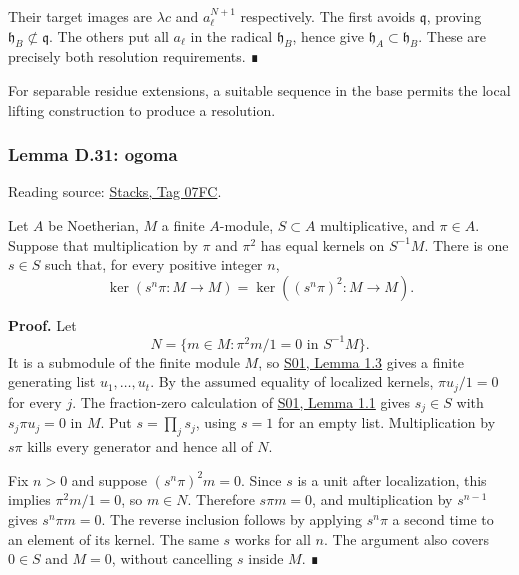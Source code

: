 \documentclass[11pt,a4paper,openany]{report}
\begin{document}
Their target images are \(\lambda c\) and \(a_\ell^{N+1}\) respectively. The first avoids \(\mathfrak q\), proving \(\mathfrak h_B\not\subset\mathfrak q\). The others put all \(a_\ell\) in the radical \(\mathfrak h_B\), hence give \(\mathfrak h_A\subset\mathfrak h_B\). These are precisely both resolution requirements. ∎

\label{AG-RG-S05-smoothing-section-separable}

For separable residue extensions, a suitable sequence in the base permits the local lifting construction to produce a resolution.

\label{AG-RG-S05-smoothing-lemma-ogoma}

\subsubsection{Lemma D.31: ogoma}\label{AG-RG-S05-lemma-d.31-ogoma}

Reading source: \href{https://stacks.math.columbia.edu/tag/07FC}{Stacks, Tag 07FC}.

Let \(A\) be Noetherian, \(M\) a finite \(A\)-module, \(S\subset A\) multiplicative, and \(\pi\in A\). Suppose that multiplication by \(\pi\) and \(\pi^2\) has equal kernels on \(S^{-1}M\). There is one \(s\in S\) such that, for every positive integer \(n\), \[
\ker(s^n\pi:M\to M)=\ker((s^n\pi)^2:M\to M).
\]

\textbf{Proof.} Let \[
N=\{m\in M:\pi^2m/1=0\text{ in }S^{-1}M\}.
\] It is a submodule of the finite module \(M\), so \href{https://github.com/KokunoYumeto/open-math-courses/blob/main/docs/courses/AG-RG/AG-RG-S01.md}{S01, Lemma 1.3} gives a finite generating list \(u_1,\ldots,u_t\). By the assumed equality of localized kernels, \(\pi u_j/1=0\) for every \(j\). The fraction-zero calculation of \href{https://github.com/KokunoYumeto/open-math-courses/blob/main/docs/courses/AG-RG/AG-RG-S01.md}{S01, Lemma 1.1} gives \(s_j\in S\) with \(s_j\pi u_j=0\) in \(M\). Put \(s=\prod_j s_j\), using \(s=1\) for an empty list. Multiplication by \(s\pi\) kills every generator and hence all of \(N\).

Fix \(n>0\) and suppose \((s^n\pi)^2m=0\). Since \(s\) is a unit after localization, this implies \(\pi^2m/1=0\), so \(m\in N\). Therefore \(s\pi m=0\), and multiplication by \(s^{n-1}\) gives \(s^n\pi m=0\). The reverse inclusion follows by applying \(s^n\pi\) a second time to an element of its kernel. The same \(s\) works for all \(n\). The argument also covers \(0\in S\) and \(M=0\), without cancelling \(s\) inside \(M\). ∎
\end{document}
